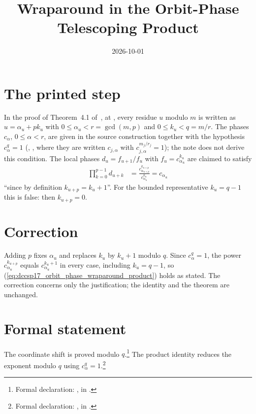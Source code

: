 \documentclass{article}
\title{Wraparound in the Orbit-Phase Telescoping Product}
\author{}
\date{2026-10-01}
\begin{document}
\maketitle
{}

\section{The printed step}
In the proof of Theorem~4.1 of~\cite{DeLasCuevas2017Irreducible}, at
, every residue $u$ modulo $m$ is
written as $u=\alpha_u+pk_u$ with $0\le\alpha_u<r=\gcd(m,p)$ and
$0\le k_u<q=m/r$. The phases $c_\alpha$, $0\le\alpha<r$, are given in the
source construction together with the hypothesis $c_\alpha^q=1$
(\cite{DeLasCuevas2017Irreducible}, ,
where they are written $c_{j,\alpha}$ with $c_{j,\alpha}^{m_j/r_j}=1$); the
note does not derive this condition. The local phases $d_u=f_{u+1}/f_u$ with
$f_u=c_{\alpha_u}^{k_u}$ are claimed to satisfy
\begin{align}
    \prod_{k=0}^{p-1}d_{u+k}
     & =\frac{c_{\alpha_{u+p}}^{k_{u+p}}}{c_{\alpha_u}^{k_u}}=c_{\alpha_u}
    \label{eq:dccsp17_orbit_phase_wraparound_product}
\end{align}
``since by definition $k_{u+p}=k_u+1$''. For the bounded representative
$k_u=q-1$ this is false: then $k_{u+p}=0$.

\section{Correction}
Adding $p$ fixes $\alpha_u$ and replaces $k_u$ by $k_u+1$ modulo $q$.
Since $c_{\alpha}^q=1$, the power $c_{\alpha_u}^{k_{u+p}}$ equals
$c_{\alpha_u}^{k_u+1}$ in every case, including $k_u=q-1$, so
(\ref{eq:dccsp17_orbit_phase_wraparound_product}) holds as stated. The
correction concerns only the justification; the identity and the theorem are
unchanged.

\section{Formal statement}
The coordinate shift is proved modulo $q$.\footnote{Formal declaration:
    , in
    .}
The product identity reduces the exponent modulo $q$ using $c_\alpha^q=1$.\footnote{Formal
    declaration: , in
    .}



\end{document}
